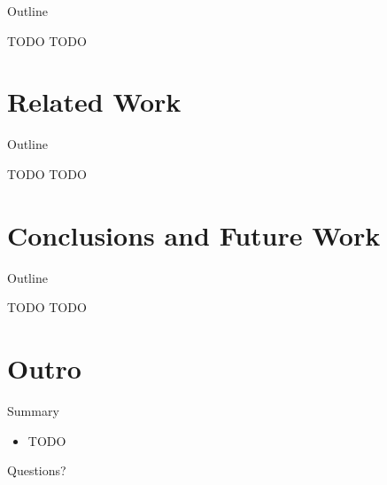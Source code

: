 \begin{frame}{Outline}
  \tableofcontents[current]
\end{frame}

\note{
}

\begin{frame}{TODO}
  TODO
\end{frame}

\note{
}


\section{Related Work}

\begin{frame}{Outline}
  \tableofcontents[current]
\end{frame}

\note{
}

\begin{frame}{TODO}
  TODO
\end{frame}

\note{
}


\section{Conclusions and Future Work}

\begin{frame}{Outline}
  \tableofcontents[current]
\end{frame}

\note{
}

\begin{frame}{TODO}
  TODO
\end{frame}

\note{
}


\section*{Outro}

\begin{frame}{Summary}
  \begin{itemize}
  \item TODO
  \end{itemize}
\end{frame}

\note{
}

\begin{frame}
  \begin{center}
    \huge Questions?
  \end{center}
\end{frame}

\note{
}


